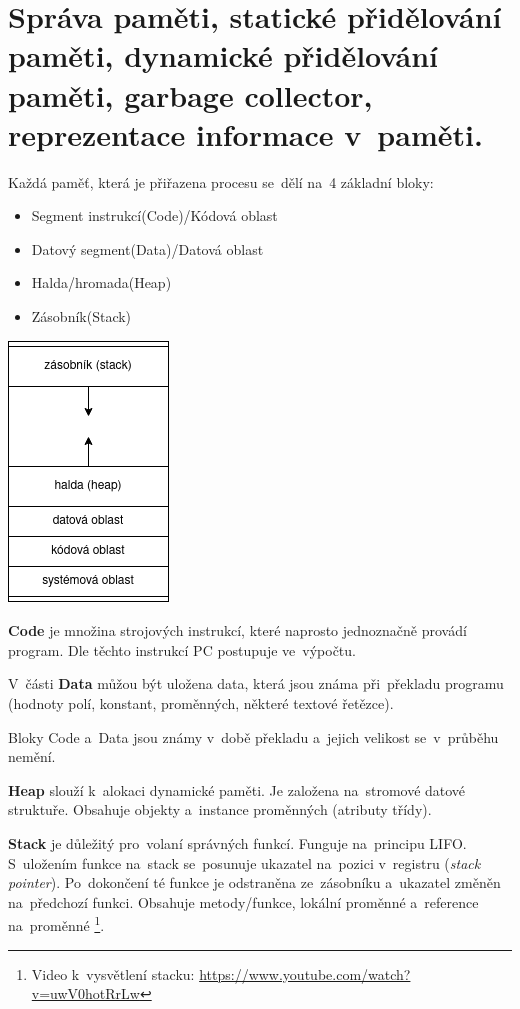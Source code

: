 \section{Správa paměti, statické přidělování paměti, dynamické přidělování paměti, garbage collector, reprezentace informace v~paměti.}

Každá paměť, která je přiřazena procesu se~dělí na~4 základní bloky:

\begin{multicols}{2}
	\begin{itemize}[noitemsep]
		\item Segment instrukcí(Code)/Kódová oblast
		\item Datový segment(Data)/Datová oblast
		\item Halda/hromada(Heap)
		\item Zásobník(Stack)
		\vfill
	\end{itemize}
	\includegraphics[scale=0.3]{images/pamet.png}
\end{multicols}

\textbf{Code} je množina strojových instrukcí, které naprosto jednoznačně provádí program. Dle těchto instrukcí PC postupuje ve~výpočtu.

V~části \textbf{Data} můžou být uložena data, která jsou známa při~překladu programu (hodnoty polí, konstant, proměnných, některé textové řetězce).

Bloky Code a~Data jsou známy v~době překladu a~jejich velikost se~v~průběhu nemění.

\textbf{Heap} slouží k~alokaci dynamické paměti. Je založena na~stromové datové struktuře. Obsahuje objekty a~instance proměnných (atributy třídy).

\textbf{Stack} je důležitý pro~volaní správných funkcí. Funguje na~principu LIFO. S~uložením funkce na~stack se~posunuje ukazatel na~pozici v~registru (\emph{stack pointer}). Po~dokončení té funkce je odstraněna ze~zásobníku a~ukazatel změněn na~předchozí funkci. Obsahuje metody/funkce, lokální proměnné a~reference na~proměnné%
\footnote{Video k~vysvětlení stacku: \url{https://www.youtube.com/watch?v=uwV0hotRrLw}}.

